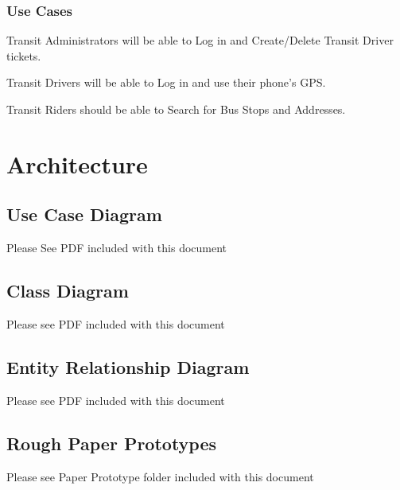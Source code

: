 \documentclass[a4paper,12pt]{article}
\begin{document}
\subsubsection{Use Cases}
Transit Administrators will be able to Log in and Create/Delete Transit Driver tickets.

Transit Drivers will be able to Log in and use their phone's GPS.

Transit Riders should be able to Search for Bus Stops and Addresses.


\pagebreak
\section{Architecture}
\subsection{Use Case Diagram}
Please See PDF included with this document
\subsection{Class Diagram}
Please see PDF included with this document
\subsection{Entity Relationship Diagram}
Please see PDF included with this document
\subsection{Rough Paper Prototypes}
Please see Paper Prototype folder included with this document

\pagebreak
\end{document}
